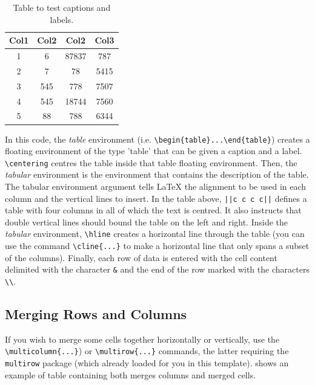 \documentclass[11pt,twoside,openright]{report}
\begin{document}
\begin{table}[!ht]
 \centering
 \begin{tabular}{||c c c c||} 
 \hline
 Col1 & Col2 & Col2 & Col3 \\
 \hline\hline
 1 & 6 & 87837 & 787 \\ 
 2 & 7 & 78 & 5415 \\
 3 & 545 & 778 & 7507 \\
 4 & 545 & 18744 & 7560 \\
 5 & 88 & 788 & 6344 \\
 \hline
 \end{tabular}
 \caption{Table to test captions and labels.}
 \label{tab:MyFirstTable}
\end{table}

In this code, the \emph{table} environment (i.e. \verb|\begin{table}...\end{table}|) creates a floating environment of the type 'table' that can be given a caption and a label. 
\verb|\centering| centres the table inside that table floating environment. 
Then, the \emph{tabular} environment is the environment that contains the description of the table. 
The tabular environment argument tells LaTeX the alignment to be used in each column and the vertical lines to insert. 
In the table above, \verb!||c c c c||! defines a table with four columns in all of which the text is centred. 
It also instructs that double vertical lines should bound the table on the left and right. 
Inside the \emph{tabular} environment, \verb|\hline| creates a horizontal line through the table (you can use the command \verb|\cline{...}| to make a horizontal line that only spans a subset of the columns). Finally, each row of data is entered with the cell content delimited with the character \verb|&| and the end of the row marked with the characters \verb|\\|.


\subsection{Merging Rows and Columns}
\label{sec:TableRowMerging}

If you wish to merge some cells together horizontally or vertically, use the \verb|\multicolumn{...}|) or \verb|\multirow{...}| commands, the latter requiring the \verb|multirow| package (which already loaded for you in this template).
 shows an example of table containing both merges columns and merged cells.
\end{document}
